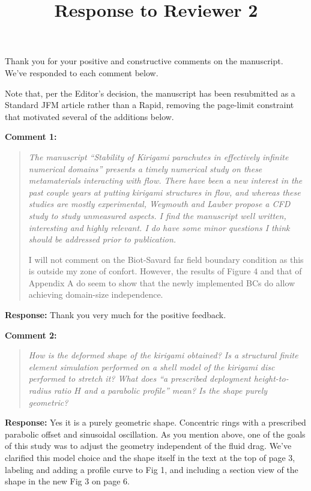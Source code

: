 \documentclass[11pt]{article}
\title{Response to Reviewer 2}
\author{}
\date{}
\newenvironment{comment}[1]{\vspace{4mm}\par\noindent\textbf{Comment #1:}\begin{quote}\itshape}{\end{quote}}\newcommand{\response}[1]{\par\noindent\textbf{Response:} #1}
\begin{document}
\maketitle

Thank you for your positive and constructive comments on the manuscript. We've responded to each comment below. 

Note that, per the Editor's decision, the manuscript has been resubmitted
as a Standard JFM article rather than a Rapid, removing the page-limit constraint that motivated several of the additions below.

\begin{comment}1
The manuscript ``Stability of Kirigami parachutes in effectively infinite numerical domains'' presents a timely numerical study on these metamaterials interacting with flow. There have been a new interest in the past couple years at putting kirigami structures in flow, and whereas these studies are mostly experimental, Weymouth and Lauber propose a CFD study to study unmeasured aspects. I find the manuscript well written, interesting and highly relevant. I do have some minor questions I think should be addressed prior to publication.

I will not comment on the Biot-Savard far field boundary condition as this is outside my zone of confort. However, the results of Figure 4 and that of Appendix A do seem to show that the newly implemented BCs do allow achieving domain-size independence.
\end{comment}
\response{}
Thank you very much for the positive feedback. 

\begin{comment}2
How is the deformed shape of the kirigami obtained? Is a structural finite element
simulation performed on a shell model of the kirigami disc performed to stretch it?
What does ``a prescribed deployment height-to-radius ratio $H$ and a parabolic
profile'' mean? Is the shape purely geometric?
\end{comment}
\response{}
Yes it is a purely geometric shape. Concentric rings with a prescribed parabolic offset and sinusoidal oscillation. As you mention above, one of the goals of this study was to adjust the geometry independent of the fluid drag. We've clarified this model choice and the shape itself in the text at the top of page 3, labeling and adding a profile curve to Fig 1, and including a section view of the shape in the new Fig 3 on page 6. 
\end{document}
